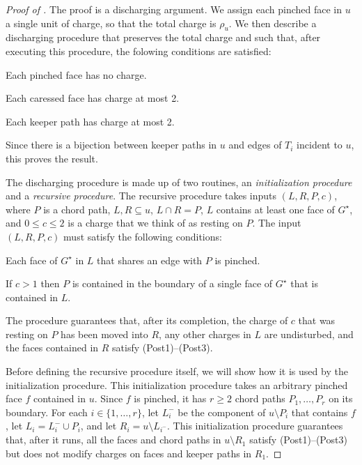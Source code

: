 \documentclass{patmorin}
\newcommand{\dual}[1]{{#1}^\star}
\begin{document}
\begin{proof}[Proof of ]
   The proof is a discharging argument.  We assign each pinched face in
   $u$ a single unit of charge, so that the total charge is $\rho_u$.
   We then describe a discharging procedure that preserves the total
   charge and such that, after executing this procedure, the folowing conditions are satisfied:
   \begin{compactenum}[(Post1)]
        \item Each pinched face has no charge.
        \item Each caressed face has charge at most 2.
        \item Each keeper path has charge at most 2.
    \end{compactenum}
    Since there is a bijection between keeper paths in $u$ and edges of $T_i$ incident to $u$, this proves the result.

    The discharging procedure is made up of two routines, an \emph{initialization procedure} and a \emph{recursive procedure}.  The recursive procedure takes inputs $(L,R,P,c)$, where $P$ is a chord path, $L,R\subseteq u$, $L\cap R=P$, $L$ contains at least one face of $\dual{G}$, and $0\le c\le 2$ is a charge that we think of as resting on $P$.  The input $(L,R,P,c)$ must satisfy the following conditions:
   \begin{compactenum}[(Pre1)]
        \item Each face of $\dual{G}$ in $L$ that shares an edge with $P$
        is pinched.
        \item If $c>1$ then $P$ is contained in the boundary of a single face of $\dual{G}$ that is contained in $L$.
    \end{compactenum}
    The procedure guarantees that, after its completion, the charge of $c$ that was resting on $P$ has been moved into $R$, any other charges in $L$ are undisturbed, and the faces contained in $R$ satisfy (Post1)--(Post3).

    Before defining the recursive procedure itself, we will show how it is used by the initialization procedure.  This initialization procedure takes an arbitrary pinched face $f$ contained in $u$.  Since $f$ is pinched, it has $r\ge 2$ chord paths $P_1,\ldots,P_r$ on its boundary. For each $i\in\{1,\ldots,r\}$, let $L_i^-$ be the component of $u\setminus P_i$ that contains $f$, let $L_i=L_i^-\cup P_i$, and let $R_i=u\setminus L_{i^-}$.
    This initialization procedure guarantees that, after it runs, all the faces and chord paths in $u\setminus R_1$ satisfy (Post1)--(Post3) but does not modify charges on faces and keeper paths in $R_1$.


\end{proof}
\end{document}
